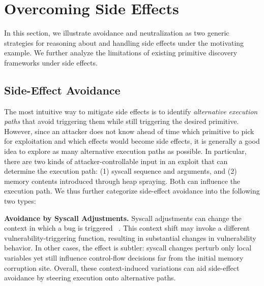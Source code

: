\section{Overcoming Side Effects}
In this section, we illustrate avoidance and neutralization as two generic strategies for reasoning about and handling side effects under the motivating example. We further analyze the limitations of existing primitive discovery frameworks under side effects.

\subsection{Side-Effect Avoidance} %


The most intuitive way to mitigate side effects is to identify \textit{alternative execution paths} that avoid triggering them while still triggering the desired primitive. However, since an attacker does not know ahead of time which primitive to pick for exploitation and which effects would become side effects, it is generally a good idea to explore as many alternative execution paths as possible. In particular, there are two kinds of attacker-controllable input in an exploit that can determine the execution path: (1) syscall sequence and arguments, and (2) memory contents introduced through heap spraying. Both can influence the execution path. We thus further categorize side-effect avoidance into the following two types:

\vspace{0.015in}
\noindent\textbf{Avoidance by Syscall Adjustments.}
Syscall adjustments can change the context in which a bug is triggered ~\cite{zou2022syzscope}. This context shift may invoke a different vulnerability-triggering function, resulting in substantial changes in vulnerability behavior. In other cases, the effect is subtler: syscall changes perturb only local variables yet still influence control-flow decisions far from the initial memory corruption site. Overall, these context-induced variations can aid side-effect avoidance by steering execution onto alternative paths.


